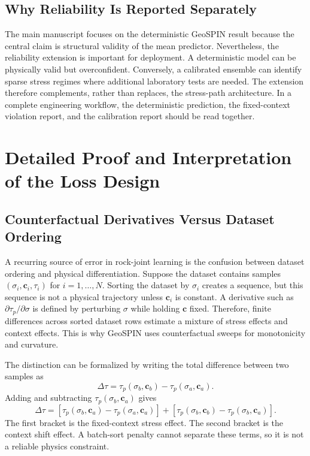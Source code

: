 \documentclass[journal]{IEEEtran}
\begin{document}
\subsection{Why Reliability Is Reported Separately}
The main manuscript focuses on the deterministic GeoSPIN result because the central claim is structural validity of the mean predictor. Nevertheless, the reliability extension is important for deployment. A deterministic model can be physically valid but overconfident. Conversely, a calibrated ensemble can identify sparse stress regimes where additional laboratory tests are needed. The extension therefore complements, rather than replaces, the stress-path architecture. In a complete engineering workflow, the deterministic prediction, the fixed-context violation report, and the calibration report should be read together.

\section{Detailed Proof and Interpretation of the Loss Design}
\subsection{Counterfactual Derivatives Versus Dataset Ordering}
A recurring source of error in rock-joint learning is the confusion between dataset ordering and physical differentiation. Suppose the dataset contains samples $(\sigma_i,\mathbf{c}_i,\tau_i)$ for $i=1,\ldots,N$. Sorting the dataset by $\sigma_i$ creates a sequence, but this sequence is not a physical trajectory unless $\mathbf{c}_i$ is constant. A derivative such as $\partial\tau_p/\partial\sigma$ is defined by perturbing $\sigma$ while holding $\mathbf{c}$ fixed. Therefore, finite differences across sorted dataset rows estimate a mixture of stress effects and context effects. This is why GeoSPIN uses counterfactual sweeps for monotonicity and curvature.

The distinction can be formalized by writing the total difference between two samples as
\begin{equation}
\Delta \tau = \tau_p(\sigma_b,\mathbf{c}_b)-\tau_p(\sigma_a,\mathbf{c}_a).
\end{equation}
Adding and subtracting $\tau_p(\sigma_b,\mathbf{c}_a)$ gives
\begin{equation}
\Delta \tau = [\tau_p(\sigma_b,\mathbf{c}_a)-\tau_p(\sigma_a,\mathbf{c}_a)]+[\tau_p(\sigma_b,\mathbf{c}_b)-\tau_p(\sigma_b,\mathbf{c}_a)].
\end{equation}
The first bracket is the fixed-context stress effect. The second bracket is the context shift effect. A batch-sort penalty cannot separate these terms, so it is not a reliable physics constraint.
\end{document}

